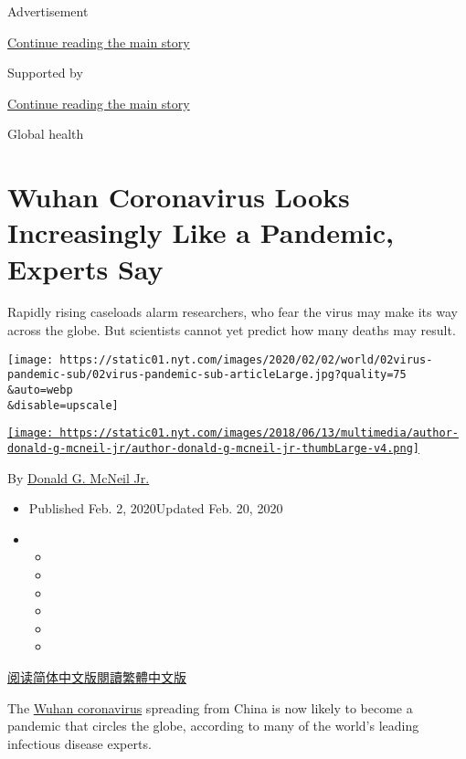 Advertisement

\protect\hyperlink{after-top}{Continue reading the main story}

Supported by

\protect\hyperlink{after-sponsor}{Continue reading the main story}

Global health

\hypertarget{wuhan-coronavirus-looks-increasingly-like-a-pandemic-experts-say}{%
\section{Wuhan Coronavirus Looks Increasingly Like a Pandemic, Experts
Say}\label{wuhan-coronavirus-looks-increasingly-like-a-pandemic-experts-say}}

Rapidly rising caseloads alarm researchers, who fear the virus may make
its way across the globe. But scientists cannot yet predict how many
deaths may result.

\texttt{[image: https://static01.nyt.com/images/2020/02/02/world/02virus-pandemic-sub/02virus-pandemic-sub-articleLarge.jpg?quality=75\\\&auto=webp\\\&disable=upscale]}

\href{https://www.nytimes.com/by/donald-g-mcneil-jr}{\texttt{[image: https://static01.nyt.com/images/2018/06/13/multimedia/author-donald-g-mcneil-jr/author-donald-g-mcneil-jr-thumbLarge-v4.png]}}

By \href{https://www.nytimes.com/by/donald-g-mcneil-jr}{Donald G. McNeil
Jr.}

\begin{itemize}
\item
  Published Feb. 2, 2020Updated Feb. 20, 2020
\item
  \begin{itemize}
  \item
  \item
  \item
  \item
  \item
  \item
  \end{itemize}
\end{itemize}

\href{https://cn.nytimes.com/china/20200203/coronavirus-pandemic-china/}{阅读简体中文版}\href{https://cn.nytimes.com/china/20200203/coronavirus-pandemic-china/zh-hant/}{閱讀繁體中文版}

The
\href{https://www.nytimes.com/2020/02/20/world/asia/japan-coronavirus-clusters.html}{Wuhan
coronavirus} spreading from China is now likely to become a pandemic
that circles the globe, according to many of the world's leading
infectious disease experts.

